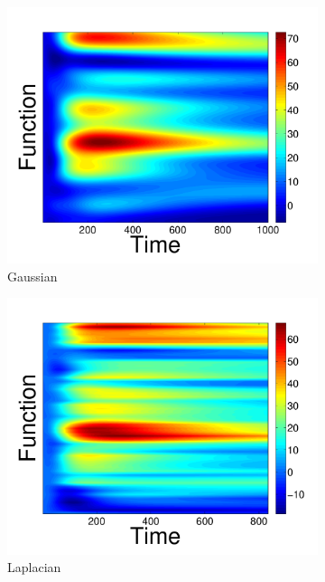 \documentclass[letterpaper,12pt,peerreviewca,draftcls]{IEEEtran}
\begin{document}
\begin{figure}[t]
\centering
\begin{subfigure}[t]{0.32\textwidth}
	\includegraphics[width=\linewidth]{"Figure 5a.pdf"}
	\caption{Gaussian}
\end{subfigure}
\begin{subfigure}[t]{0.32\textwidth}
	\includegraphics[width=\linewidth]{"Figure 5b.pdf"}
	\caption{Laplacian}
\end{subfigure}
\begin{subfigure}[t]{0.32\textwidth}

\end{subfigure}
\end{figure}
\end{document}
